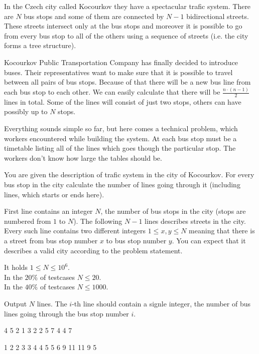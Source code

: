 





In the Czech city called Kocourkov they have a spectacular trafic system.
There are $N$ bus stops and some of them are connected by $N - 1$ bidirectional streets.
These streets intersect only at the bus stops and moreover it is possible to go from every bus stop
to all of the others using a sequence of streets (i.e. the city forms a tree structure).

Kocourkov Public Transportation Company has finally decided to introduce buses.
Their representatives want to make sure that it is possible to travel between all pairs of bus stops.
Because of that there will be a new bus line from each bus stop to each other.
We can easily calculate that there will be $\frac{n \cdot (n - 1)}{2}$ lines in total.
Some of the lines will consist of just two stops, others can have possibly up to $N$ stops.

Everything sounds simple so far, but here comes a technical problem, which workers encountered while building the system.
At each bus stop must be a timetable listing all of the lines which goes though the particular stop.
The workers don't know how large the tables should be.


You are given the description of trafic system in the city of Kocourkov.
For every bus stop in the city calculate the number of lines going through it (including lines, which starts or ends here).


First line contains an integer $N$, the number of bus stops in the city (stops are numbered from $1$ to $N$).
The following $N - 1$ lines describes streets in the city.
Every such line contains two different integers $1 \le x, y \le N$ meaning that there is a street from bus stop number $x$ to bus stop number $y$.
You can expect that it describes a valid city according to the problem statement.

\smallskip

It holds $1 \leq N \leq 10^6$.\\
In the $20\%$ of testcases $N \leq 20$.\\
In the $40\%$ of testcases $N \leq 1000$.


Output $N$ lines. The $i$-th line should contain a signle integer, the number of bus lines going through the bus stop number $i$.



4 5
2 1
3 2
2 5
7
4
4
7
\sampleEND


\bigskip


1 2
2 3
3 4
4 5
5 6
9
11
11
9
5
\sampleEND



